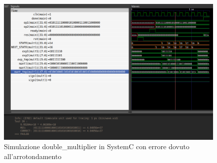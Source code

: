 \documentclass[]{IEEEtran}
\begin{document}
\begin{figure}[bt]
    \centering
    \includegraphics[width=\textwidth]{figures/sc_error}
    \caption{Simulazione double\_multiplier in SystemC con errore dovuto all'arrotondamento}
    \label{fig:SIM_SC_ERROR}
\end{figure}
\end{document}
